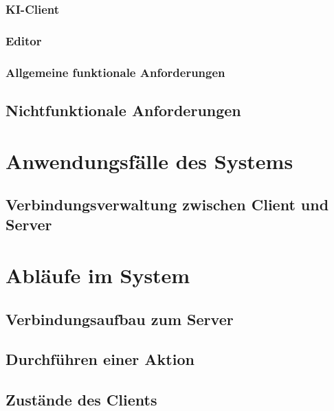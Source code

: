 \documentclass{uulm-assignment}
\begin{document}
\clearpage
\subsubsection{KI-Client}

\subsubsection{Editor}


\clearpage
\subsubsection{Allgemeine funktionale Anforderungen}


\clearpage
\subsection{Nichtfunktionale Anforderungen}


\clearpage
{}
\section{Anwendungsfälle des Systems}
\subsection{Verbindungsverwaltung zwischen Client und Server}



\section{Abläufe im System}
\subsection{Verbindungsaufbau zum Server}


\clearpage
\subsection{Durchführen einer Aktion}


\clearpage
\subsection{Zustände des Clients}

\end{document}
